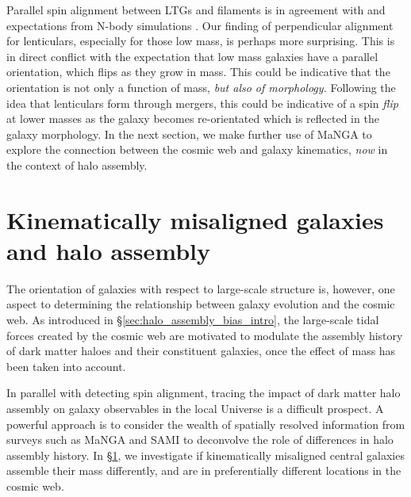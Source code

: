 Parallel spin alignment between LTGs and filaments is in agreement with \cite{welker2020} and expectations from N-body simulations \citep[e.g.][]{laigle2015}. Our finding of perpendicular alignment for lenticulars, especially for those low mass, is perhaps more surprising. This is in direct conflict with the expectation that low mass galaxies have a parallel orientation, which flips as they grow in mass. This could be indicative that the orientation is not only a function of mass, \textit{but also of morphology.} Following the idea that lenticulars form through mergers, this could be indicative of a spin \textit{flip} at lower masses as the galaxy becomes re-orientated which is reflected in the galaxy morphology. In the next section, we make further use of MaNGA to explore the connection between the cosmic web and galaxy kinematics, \textit{now} in the context of halo assembly.

\section{Kinematically misaligned galaxies and halo assembly} \label{sec:halo_assembly}
The orientation of galaxies with respect to large-scale structure is, however, one aspect to determining the relationship between galaxy evolution and the cosmic web. As introduced in \S\ref{sec:halo_assembly_bias_intro}, the large-scale tidal forces created by the cosmic web are motivated to modulate the assembly history of dark matter haloes and their constituent galaxies, once the effect of mass has been taken into account. 

In parallel with detecting spin alignment, tracing the impact of dark matter halo assembly on galaxy observables in the local Universe is a difficult prospect. A powerful approach is to consider the wealth of spatially resolved information from surveys such as MaNGA and SAMI to deconvolve the role of differences in halo assembly history. In \S\ref{sec:halo_assembly}, we investigate if kinematically misaligned central galaxies assemble their mass differently, and are in preferentially different locations in the cosmic web.

